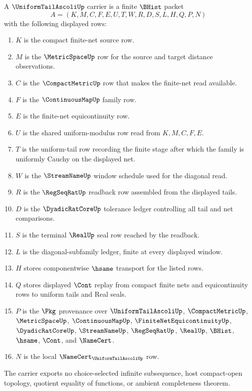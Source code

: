 \begin{definition}
\label{def:uniform-tail-ascoli-carrier}
A $\UniformTailAscoliUp$ carrier is a finite $\BHist$ packet
$$
A=(K,M,C,F,E,U,T,W,R,D,S,L,H,Q,P,N)
$$
with the following displayed rows:
\begin{enumerate}
\item $K$ is the compact finite-net source row.
\item $M$ is the $\MetricSpaceUp$ row for the source and target distance observations.
\item $C$ is the $\CompactMetricUp$ row that makes the finite-net read available.
\item $F$ is the $\ContinuousMapUp$ family row.
\item $E$ is the finite-net equicontinuity row.
\item $U$ is the shared uniform-modulus row read from $K,M,C,F,E$.
\item $T$ is the uniform-tail row recording the finite stage after which the family is uniformly Cauchy on the displayed net.
\item $W$ is the $\StreamNameUp$ window schedule used for the diagonal read.
\item $R$ is the $\RegSeqRatUp$ readback row assembled from the displayed tails.
\item $D$ is the $\DyadicRatCoreUp$ tolerance ledger controlling all tail and net comparisons.
\item $S$ is the terminal $\RealUp$ seal row reached by the readback.
\item $L$ is the diagonal-subfamily ledger, finite at every displayed window.
\item $H$ stores componentwise $\hsame$ transport for the listed rows.
\item $Q$ stores displayed $\Cont$ replay from compact finite nets and equicontinuity rows to uniform tails and Real seals.
\item $P$ is the $\Pkg$ provenance over $\UniformTailAscoliUp$, $\CompactMetricUp$, $\MetricSpaceUp$, $\ContinuousMapUp$, $\FiniteNetEquicontinuityUp$, $\DyadicRatCoreUp$, $\StreamNameUp$, $\RegSeqRatUp$, $\RealUp$, $\BHist$, $\hsame$, $\Cont$, and $\NameCert$.
\item $N$ is the local $\NameCert_{\UniformTailAscoliUp}$ row.
\end{enumerate}
The carrier exports no choice-selected infinite subsequence, host compact-open topology, quotient equality of functions, or ambient completeness theorem.
\end{definition}

